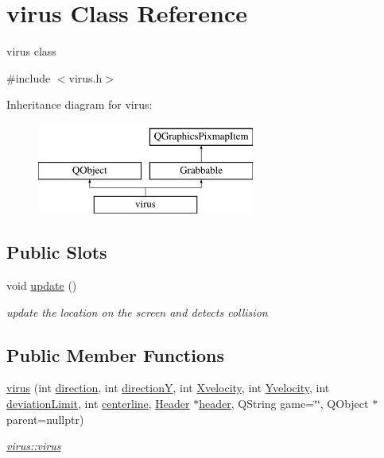 \hypertarget{classvirus}{\section{virus Class Reference}
\label{classvirus}
}


virus class  




{\ttfamily \#include $<$virus.\-h$>$}

Inheritance diagram for virus\-:\begin{figure}[H]
\begin{center}
\leavevmode
\includegraphics[height=3.000000cm]{classvirus}
\end{center}
\end{figure}
\subsection*{Public Slots}
\begin{DoxyCompactItemize}
\item 
void \hyperlink{classvirus_a8b036fc788433ad3a705e9de6de41ee2}{update} ()
\begin{DoxyCompactList}\small\item\em update the location on the screen and detects collision \end{DoxyCompactList}\end{DoxyCompactItemize}
\subsection*{Public Member Functions}
\begin{DoxyCompactItemize}
\item 
\hyperlink{classvirus_a6b57c52b134bccc26837cbf344d7adf3}{virus} (int \hyperlink{classvirus_aa11b0a8ce6eb48a0342632c3a6117a4f}{direction}, int \hyperlink{classvirus_a8500ee5b376d25ad355e6d44cf1a7c33}{direction\-Y}, int \hyperlink{classvirus_a819b31358027382d81b7490ca08e4858}{Xvelocity}, int \hyperlink{classvirus_ada2944c1d4e132d5400966a50069877d}{Yvelocity}, int \hyperlink{classvirus_a06e077e131c4aff9fa3bd319ec16729e}{deviation\-Limit}, int \hyperlink{classvirus_a57754b0eecd000e4ba555a6953489455}{centerline}, \hyperlink{classHeader}{Header} $\ast$\hyperlink{classGrabbable_a97db8193dec83a8086352f80a30b2038}{header}, Q\-String game=\char`\"{}\char`\"{}, Q\-Object $\ast$parent=nullptr)
\begin{DoxyCompactList}\small\item\em \hyperlink{classvirus_a6b57c52b134bccc26837cbf344d7adf3}{virus\-::virus} \end{DoxyCompactList}\end{DoxyCompactItemize}
